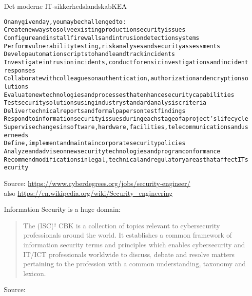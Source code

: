 \documentclass[Screen16to9,17pt]{foils}
\begin{document}
{}

\mytitlepage
{Det moderne IT-sikkerhedslandskab}{KEA}

\hlkprofil


\begin{alltt}\small
On any given day, you may be challenged to:
        Create new ways to solve existing production security issues
        Configure and install firewalls and intrusion detection systems
        Perform vulnerability testing, risk analyses and security assessments
        Develop automation scripts to handle and track incidents
        Investigate intrusion incidents, conduct forensic investigations and incident responses
        Collaborate with colleagues on authentication, authorization and encryption solutions
        Evaluate new technologies and processes that enhance security capabilities
        Test security solutions using industry standard analysis criteria
        Deliver technical reports and formal papers on test findings
        Respond to information security issues during each stage of a project’s lifecycle
        Supervise changes in software, hardware, facilities, telecommunications and user needs
        Define, implement and maintain corporate security policies
        Analyze and advise on new security technologies and program conformance
        Recommend modifications in legal, technical and regulatory areas that affect IT security
\end{alltt}

Source: \url{https://www.cyberdegrees.org/jobs/security-engineer/}\\
also
\url{https://en.wikipedia.org/wiki/Security_engineering}




Information Security is a huge domain:

\begin{quote}
The (ISC)² CBK is a collection of topics relevant to cybersecurity professionals around the world. It establishes a common framework of information security terms and principles which enables cybersecurity and IT/ICT professionals worldwide to discuss, debate and resolve matters pertaining to the profession with a common understanding, taxonomy and lexicon.
\end{quote}
Source: 
\end{document}
